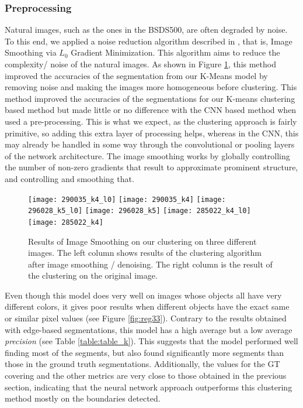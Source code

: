 \documentclass[10pt, twocolumn, twoside]{article}
\begin{document}
\subsubsection{Preprocessing}

Natural images, such as the ones in the BSDS500, are often degraded by noise. To this end, we applied a noise reduction algorithm described in \cite{Xu}, that is, Image Smoothing via $L_0$ Gradient Minimization. This algorithm aims to reduce the complexity/ noise of the natural images.
As shown in Figure \ref{fig:reg3}, this method improved the accuracies of the segmentation from our K-Means model by removing noise and making the images more homogeneous before clustering. This method improved the accuracies of the segmentations for our K-means clustering based method but made little or no difference with the CNN based method when used a pre-processing. This is what we expect, as the clustering approach is fairly primitive, so adding this extra layer of processing helps, whereas in the CNN, this may already be handled in some way through the convolutional or pooling layers of the network architecture. The image smoothing works by globally controlling the number of non-zero gradients that result to approximate prominent structure, and controlling and smoothing that. 

\begin{figure}[ht]
    \centering
    \texttt{[image: 290035\_k4\_l0]}
    \texttt{[image: 290035\_k4]}
    \texttt{[image: 296028\_k5\_l0]}
    \texttt{[image: 296028\_k5]}
    \texttt{[image: 285022\_k4\_l0]}
    \texttt{[image: 285022\_k4]}

    \caption{Results of Image Smoothing on our clustering on three different images. The left column shows results of the clustering algorithm after image smoothing / denoising. The right column is the result of the clustering on the original image.}
    \label{fig:reg3}
\end{figure}

Even though this model does very well on images whose objects all have very different colors, it gives poor results when different objects have the exact same or similar pixel values (see Figure \ref{fig:reg33}). Contrary to the results obtained with edge-based segmentations, this model has a high average  but a low average \textit{precision} (see Table \ref{table:table_k}). This suggests that the model performed well finding most of the segments, but also found significantly more segments than those in the ground truth segmentations. Additionally, the values for the GT covering and the other metrics are very close to those obtained in the previous section, indicating that the neural network approach outperforms this clustering method mostly on the boundaries detected.
\end{document}
